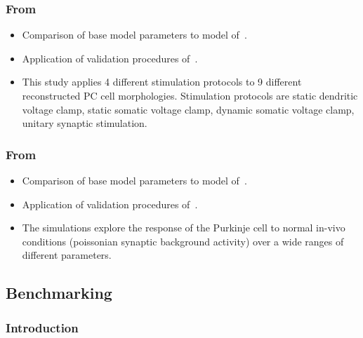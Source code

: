 \documentclass[12pt]{article}
\begin{document}
\subsubsection*{From~\cite{bower09:_compar_evolut_comput_analy_cereb}}

\begin{itemize}
\item Comparison of base model parameters to model of~\cite{E:1994hc}.
\item Application of validation procedures
  of~\cite{De-Schutter-E:1994vn}.
\item This study applies 4 different stimulation protocols to 9
  different reconstructed PC cell morphologies.  Stimulation protocols
  are static dendritic voltage clamp, static somatic voltage clamp,
  dynamic somatic voltage clamp, unitary synaptic stimulation.
\end{itemize}

\subsubsection*{From~\cite{coop09:_using_purkin}}

\begin{itemize}
\item Comparison of base model parameters to model of~\cite{E:1994hc}.
\item Application of validation procedures
  of~\cite{De-Schutter-E:1994vn}.
\item The simulations explore the response of the Purkinje cell to
  normal in-vivo conditions (poissonian synaptic background activity)
  over a wide ranges of different parameters.
\end{itemize}

\subsection*{Benchmarking}

\subsubsection*{Introduction}
\end{document}
